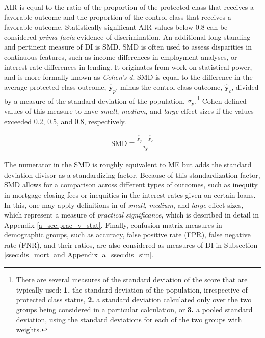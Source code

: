 \documentclass[information,article,submit,moreauthors,pdftex]{definitions/mdpi}
\begin{document}
\noindent AIR is equal to the ratio of the proportion of the protected class that receives a favorable outcome and the proportion of the control class that receives a favorable outcome. Statistically significant AIR values below 0.8 can be considered \textit{prima facia} evidence of discrimination. An additional long-standing and pertinent measure of DI is SMD. SMD is often used to assess disparities in continuous features, such as income differences in employment analyses, or interest rate differences in lending. It originates from work on statistical power, and is more formally known as \textit{Cohen’s d}. SMD is equal to the difference in the average protected class outcome, $\bar{\hat{\mathbf{y}}}_p$, minus the control class outcome, $\bar{\hat{\mathbf{y}}}_c$, divided by a measure of the standard deviation of the population, $\sigma_{\hat{\mathbf{y}}}$.\footnote{There are several measures of the standard deviation of the score that are typically used: \textbf{1.} the standard deviation of the population, irrespective of protected class status, \textbf{2.} a standard deviation calculated only over the two groups being considered in a particular calculation, or \textbf{3.} a pooled standard deviation, using the standard deviations for each of the two groups with weights.} Cohen defined values of this measure to have \textit{small}, \textit{medium}, and \textit{large} effect sizes if the values exceeded 0.2, 0.5, and 0.8, respectively.  

\begin{equation}
\label{eq:smd}
\begin{aligned}
\text{SMD} \equiv \frac{\bar{\hat{\mathbf{y}}}_p - \bar{\hat{\mathbf{y}}}_c}{ \sigma_{\hat{\mathbf{y}}}}
\end{aligned}
\end{equation}

\noindent The numerator in the SMD is roughly equivalent to ME but adds the standard deviation divisor as a standardizing factor.  Because of this standardization factor, SMD allows for a comparison across different types of outcomes, such as inequity in mortgage closing fees or inequities in the interest rates given on certain loans.  In this, one may apply definitions in \citet{cohen1988statistical} of \textit{small}, \textit{medium}, and \textit{large} effect sizes, which represent a measure of \textit{practical significance}, which is described in detail in Appendix \ref{a_sec:prac_v_stat}. Finally, confusion matrix measures in demographic groups, such as accuracy, false positive rate (FPR), false negative rate (FNR), and their ratios, are also considered as measures of DI in Subsection \ref{ssec:dis_mort} and Appendix \ref{a_ssec:dis_sim}.
\end{document}
